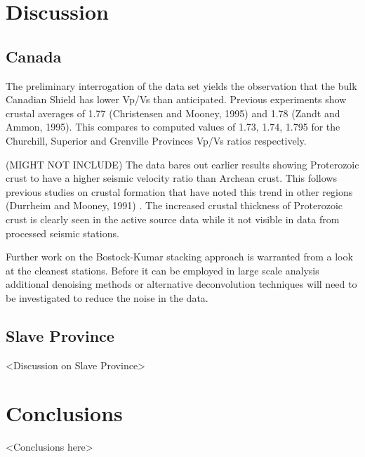 \documentclass[draft, 12pt]{article}
\begin{document}
\section{Discussion}
\subsection{Canada}

  The preliminary interrogation of the data set yields the observation that the bulk Canadian Shield has lower Vp/Vs than anticipated. Previous experiments show crustal averages of 1.77 (Christensen and Mooney, 1995) and 1.78 (Zandt and Ammon, 1995). This compares to computed values of 1.73, 1.74, 1.795 for the Churchill, Superior and Grenville Provinces Vp/Vs ratios respectively.


(MIGHT NOT INCLUDE)  The data bares out earlier results showing Proterozoic crust to have a higher seismic velocity ratio than Archean crust. This follows previous studies on crustal formation that have noted this trend in other regions (Durrheim and Mooney, 1991) . The increased crustal thickness of Proterozoic crust is clearly seen in the active source data while it not visible in data from processed seismic stations.

  Further work on the Bostock-Kumar stacking approach is warranted from a look at the cleanest stations. Before it can be employed in large scale analysis additional denoising methods or alternative deconvolution techniques will need to be investigated to reduce the noise in the data.


\subsection{Slave Province}
<Discussion on Slave Province>

\section{Conclusions}
<Conclusions here>

\end{document}
